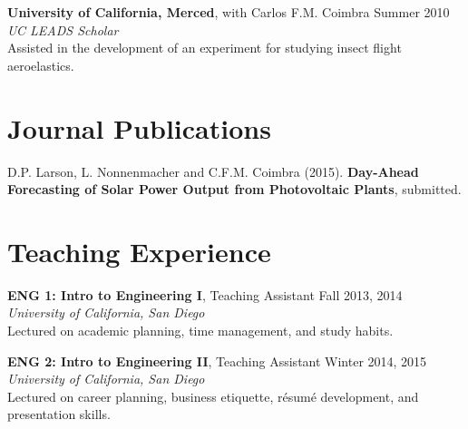 \documentclass[]{res}
\begin{document}
\begin{resume}
\textbf{University of California, Merced}, with Carlos F.M. Coimbra \hfill Summer 2010 \\
\textit{UC LEADS Scholar} \\
Assisted in the development of an experiment for studying insect flight aeroelastics.


%


\section{Journal Publications}
\vspace{0.1in}

D.P. Larson, L. Nonnenmacher and C.F.M. Coimbra (2015). \textbf{Day-Ahead Forecasting of Solar Power Output from Photovoltaic Plants}, submitted.


\section{Teaching Experience}
\vspace{0.1in}

\textbf{ENG 1: Intro to Engineering I}, Teaching Assistant \hfill Fall 2013, 2014 \\
\textit{University of California, San Diego} \\
Lectured on academic planning, time management, and study habits.

\textbf{ENG 2: Intro to Engineering II}, Teaching Assistant \hfill Winter 2014, 2015 \\
\textit{University of California, San Diego} \\
Lectured on career planning, business etiquette, r\'esum\'e development, and presentation skills.


\end{resume}
\end{document}
